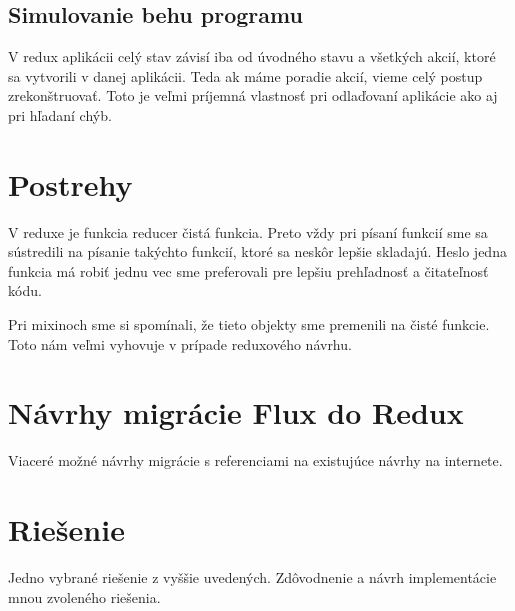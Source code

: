 \subsection{Simulovanie behu programu}
V redux aplikácii celý stav závisí iba od úvodného stavu a všetkých akcií, ktoré sa vytvorili v danej aplikácii. Teda ak máme poradie akcií, vieme celý postup zrekonštruovať. Toto je veľmi príjemná vlastnosť pri odlaďovaní aplikácie ako aj pri hľadaní chýb.

\section{Postrehy}
V reduxe je funkcia reducer čistá funkcia. Preto vždy pri písaní funkcií sme sa sústredili na písanie takýchto funkcií, ktoré sa neskôr lepšie skladajú. Heslo jedna funkcia má robiť jednu vec sme preferovali pre lepšiu prehľadnosť a čitateľnosť kódu.

Pri mixinoch sme si spomínali, že tieto objekty sme premenili na čisté funkcie. Toto nám veľmi vyhovuje v prípade reduxového návrhu.

\section{Návrhy migrácie Flux do Redux}%
Viaceré možné návrhy migrácie s referenciami na existujúce návrhy na internete.

\section{Riešenie}
Jedno vybrané riešenie z vyššie uvedených. Zdôvodnenie a návrh implementácie mnou zvoleného riešenia.

